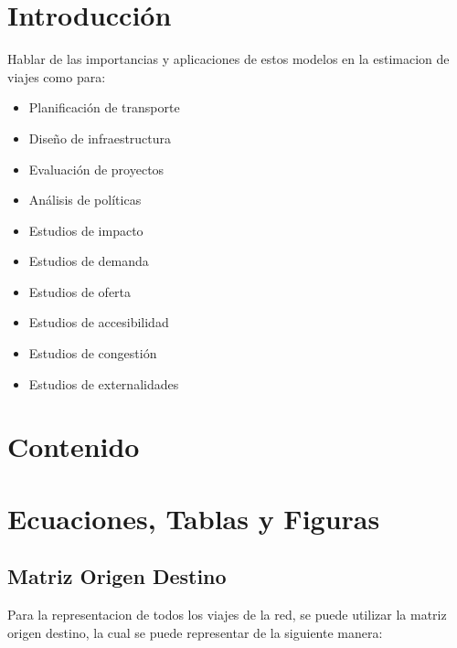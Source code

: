 \documentclass[12pt]{article} %
\begin{document}
\setcounter{page}{1} %

\section{Introducción}

Hablar de las importancias y aplicaciones de estos modelos en la estimacion de viajes como para:

\begin{itemize}
    \item Planificación de transporte
    \item Diseño de infraestructura
    \item Evaluación de proyectos
    \item Análisis de políticas
    \item Estudios de impacto
    \item Estudios de demanda
    \item Estudios de oferta
    \item Estudios de accesibilidad
    \item Estudios de congestión
    \item Estudios de externalidades
\end{itemize}

\section{Contenido}

\newpage
\section{Ecuaciones, Tablas y Figuras}

\subsection{Matriz Origen Destino}

Para la representacion de todos los viajes de la red, se puede utilizar la matriz origen destino, la cual se puede representar de la siguiente manera:
\end{document}
